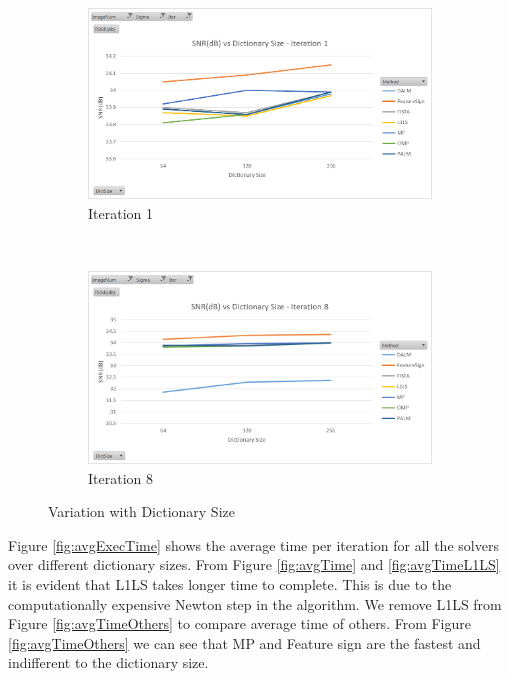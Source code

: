 \documentclass{article} %
\begin{document}
\begin{figure}[H]
        \centering
        \begin{subfigure}[b]{0.5\textwidth}
                \includegraphics[width=\textwidth]{images/graph1}
                \caption{Iteration 1}
                \label{fig:dictSizeVar1}
        \end{subfigure}%
        ~ %
        \begin{subfigure}[b]{0.5\textwidth}
                \includegraphics[width=\textwidth]{images/graph2}
                \caption{Iteration 8}
                \label{fig:dictSizeVar8}
        \end{subfigure}
        \caption{Variation with Dictionary Size}\label{fig:dictSizeVar}
\end{figure}


Figure \ref{fig:avgExecTime} shows the average time per iteration for all the solvers over different dictionary sizes. From Figure \ref{fig:avgTime} and \ref{fig:avgTimeL1LS} it is evident that L1LS takes longer time to complete. This is due to the computationally expensive Newton step in the algorithm. We remove L1LS from Figure \ref{fig:avgTimeOthers} to compare average time of others. From Figure \ref{fig:avgTimeOthers} we can see that MP and Feature sign are the fastest and indifferent to the dictionary size.
\end{document}
